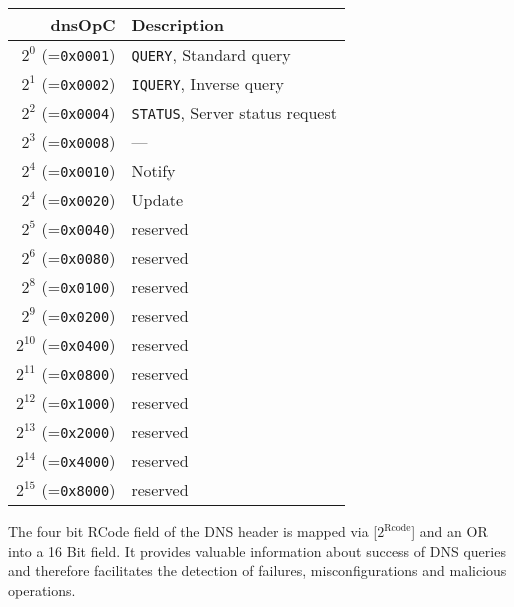 \documentclass[documentation]{subfiles}
\begin{document}
\begin{longtable}{rl}
    \toprule
    {\bf dnsOpC} & {\bf Description}\\
    \midrule\endhead%
    $2^{0}$  (={\tt 0x0001}) & {\tt QUERY}, Standard query \\
    $2^{1}$  (={\tt 0x0002}) & {\tt IQUERY}, Inverse query \\
    $2^{2}$  (={\tt 0x0004}) & {\tt STATUS}, Server status request \\
    $2^{3}$  (={\tt 0x0008}) & --- \\
    $2^{4}$  (={\tt 0x0010}) & Notify \\
    $2^{4}$  (={\tt 0x0020}) & Update \\
    $2^{5}$  (={\tt 0x0040}) & reserved \\
    $2^{6}$  (={\tt 0x0080}) & reserved \\
    $2^{8}$  (={\tt 0x0100}) & reserved \\
    $2^{9}$  (={\tt 0x0200}) & reserved \\
    $2^{10}$ (={\tt 0x0400}) & reserved \\
    $2^{11}$ (={\tt 0x0800}) & reserved \\
    $2^{12}$ (={\tt 0x1000}) & reserved \\
    $2^{13}$ (={\tt 0x2000}) & reserved \\
    $2^{14}$ (={\tt 0x4000}) & reserved \\
    $2^{15}$ (={\tt 0x8000}) & reserved \\
    \bottomrule
\end{longtable}

The four bit RCode field of the DNS header is mapped via [$2^{\text{Rcode}}$] and an OR
into a 16 Bit field. It provides valuable information about success of DNS queries
and therefore facilitates the detection of failures, misconfigurations and malicious
operations.
\end{document}

